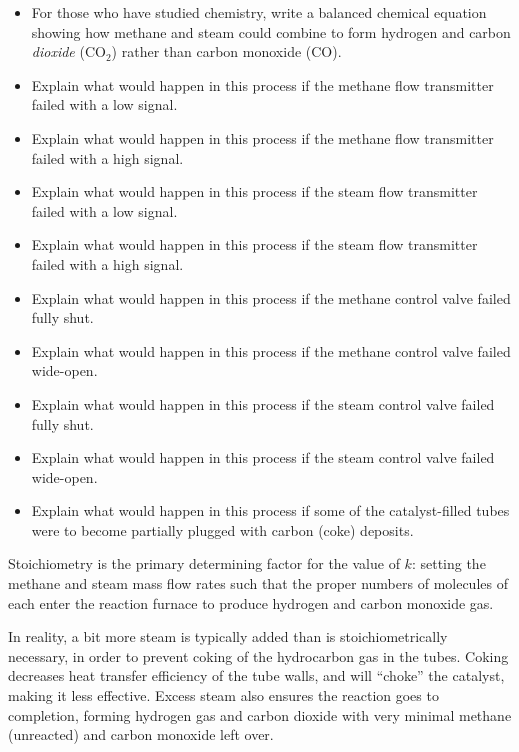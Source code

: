 \begin{itemize}
\item{} For those who have studied chemistry, write a balanced chemical equation showing how methane and steam could combine to form hydrogen and carbon {\it dioxide} (CO$_{2}$) rather than carbon monoxide (CO).
\item{} Explain what would happen in this process if the methane flow transmitter failed with a low signal.
\item{} Explain what would happen in this process if the methane flow transmitter failed with a high signal.
\item{} Explain what would happen in this process if the steam flow transmitter failed with a low signal.
\item{} Explain what would happen in this process if the steam flow transmitter failed with a high signal.
\item{} Explain what would happen in this process if the methane control valve failed fully shut.
\item{} Explain what would happen in this process if the methane control valve failed wide-open.
\item{} Explain what would happen in this process if the steam control valve failed fully shut.
\item{} Explain what would happen in this process if the steam control valve failed wide-open.
\item{} Explain what would happen in this process if some of the catalyst-filled tubes were to become partially plugged with carbon (coke) deposits.
\end{itemize}







Stoichiometry is the primary determining factor for the value of $k$: setting the methane and steam mass flow rates such that the proper numbers of molecules of each enter the reaction furnace to produce hydrogen and carbon monoxide gas.







In reality, a bit more steam is typically added than is stoichiometrically necessary, in order to prevent coking of the hydrocarbon gas in the tubes.  Coking decreases heat transfer efficiency of the tube walls, and will ``choke'' the catalyst, making it less effective.  Excess steam also ensures the reaction goes to completion, forming hydrogen gas and carbon dioxide with very minimal methane (unreacted) and carbon monoxide left over.

